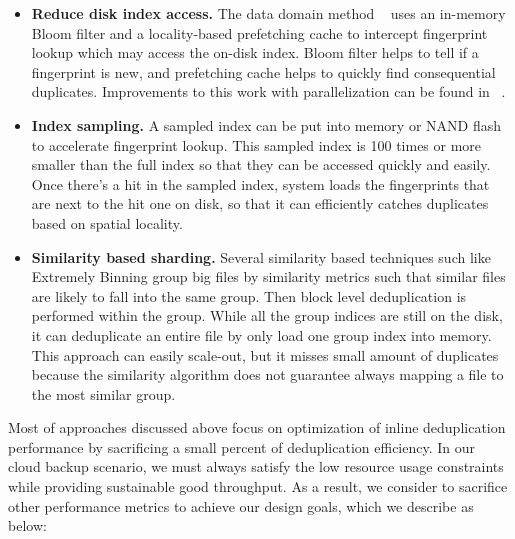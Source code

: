 \begin{itemize}
\item \textbf{Reduce disk index access.} The data domain method ~\cite{bottleneck08}
uses an in-memory Bloom filter and a locality-based prefetching cache to intercept fingerprint lookup which may
access the on-disk index. Bloom filter\cite{Bonomi2006} helps to tell if a fingerprint is new, and prefetching cache
helps to quickly find consequential duplicates. Improvements to this work with parallelization can be found
 in ~\cite{MAD210,DEBAR,nath08}.
\item \textbf{Index sampling.} A sampled index can be
put into memory\cite{sparseindex09} or NAND flash\cite{Guo2011} to accelerate fingerprint lookup.
This sampled index is 100 times or more smaller than the full index so that
they can be accessed quickly and easily.
Once there's a hit in the sampled index, system loads the fingerprints that are next to the hit one on disk,
so that it can efficiently catches duplicates based on spatial locality.
\item \textbf{Similarity based sharding.} Several similarity based techniques\cite{shingling97} such like
Extremely Binning\cite{extreme_binning09, Dong2011, Srinivasan2012, chord01} group big files by similarity metrics
such that similar files are likely to fall into the same group. Then block level deduplication is performed
within the group. While all the group indices are still on the disk, it can deduplicate an entire file
by only load one group index into memory. This approach can easily scale-out, but it misses small amount of duplicates
because the similarity algorithm does not guarantee always mapping a file to the most similar group.
\end{itemize}

Most of approaches discussed above focus on optimization of inline deduplication
performance by sacrificing a small percent of deduplication efficiency.
In our cloud backup scenario, we must always satisfy the low resource usage constraints while
providing sustainable good throughput. As a result, we consider to sacrifice other performance metrics
to achieve our design goals, which we describe as below:

